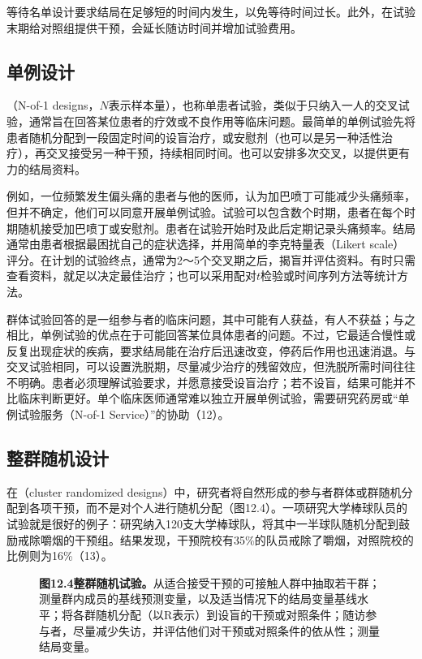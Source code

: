 等待名单设计要求结局在足够短的时间内发生，以免等待时间过长。此外，在试验末期给对照组提供干预，会延长随访时间并增加试验费用。

\subsection{单例设计}
（N-of-1 designs，$N$表示样本量），也称单患者试验，类似于只纳入一人的交叉试验，通常旨在回答某位患者的疗效或不良作用等临床问题。最简单的单例试验先将患者随机分配到一段固定时间的设盲治疗，或安慰剂（也可以是另一种活性治疗），再交叉接受另一种干预，持续相同时间。也可以安排多次交叉，以提供更有力的结局资料。

例如，一位频繁发生偏头痛的患者与他的医师，认为加巴喷丁可能减少头痛频率，但并不确定，他们可以同意开展单例试验。试验可以包含数个时期，患者在每个时期随机接受加巴喷丁或安慰剂。患者在试验开始时及此后定期记录头痛频率。结局通常由患者根据最困扰自己的症状选择，并用简单的李克特量表（Likert scale）评分。在计划的试验终点，通常为2～5个交叉期之后，揭盲并评估资料。有时只需查看资料，就足以决定最佳治疗；也可以采用配对$t$检验或时间序列方法等统计方法。

群体试验回答的是一组参与者的临床问题，其中可能有人获益，有人不获益；与之相比，单例试验的优点在于可能回答某位具体患者的问题。不过，它最适合慢性或反复出现症状的疾病，要求结局能在治疗后迅速改变，停药后作用也迅速消退。与交叉试验相同，可以设置洗脱期，尽量减少治疗的残留效应，但洗脱所需时间往往不明确。患者必须理解试验要求，并愿意接受设盲治疗；若不设盲，结果可能并不比临床判断更好。单个临床医师通常难以独立开展单例试验，需要研究药房或“单例试验服务（N-of-1 Service）”的协助（12）。

\subsection{整群随机设计}
在（cluster randomized designs）中，研究者将自然形成的参与者群体或群随机分配到各项干预，而不是对个人进行随机分配（图12.4）。一项研究大学棒球队员的试验就是很好的例子：研究纳入120支大学棒球队，将其中一半球队随机分配到鼓励戒除嚼烟的干预组。结果发现，干预院校有35\%的队员戒除了嚼烟，对照院校的比例则为16\%（13）。
\begin{figure}[htbp]\centering\chTwelveCluster
\caption*{\textbf{图12.4\quad 整群随机试验。}从适合接受干预的可接触人群中抽取若干群；测量群内成员的基线预测变量，以及适当情况下的结局变量基线水平；将各群随机分配（以R表示）到设盲的干预或对照条件；随访参与者，尽量减少失访，并评估他们对干预或对照条件的依从性；测量结局变量。}
\end{figure}

